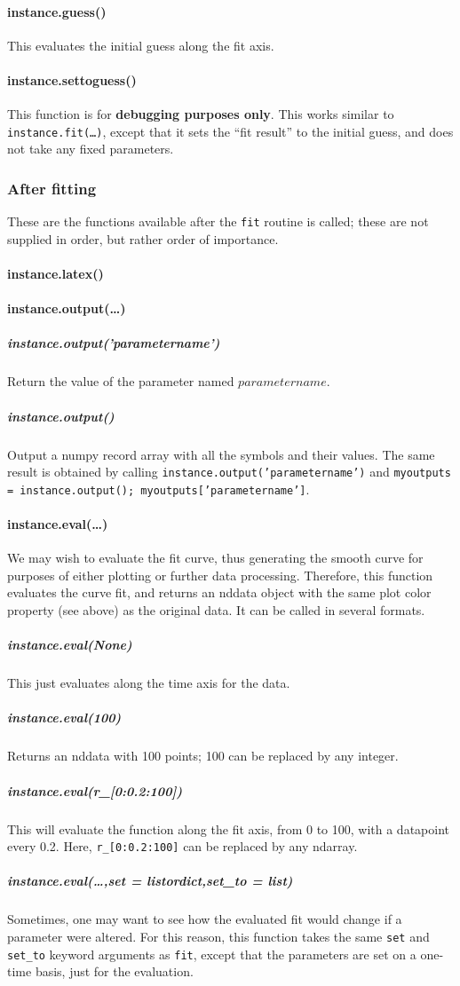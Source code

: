 \paragraph{instance.guess()}
This evaluates the initial guess along the fit axis.
\paragraph{instance.settoguess()}
This function is for {\bf debugging purposes only}.
This works similar to {\tt instance.fit(\ldots)},
    except that it sets the ``fit result'' to the initial guess,
    and does not take any fixed parameters.
\subsubsection{After fitting}
These are the functions available after the {\tt fit}
    routine is called; these are not supplied in order,
    but rather order of importance.
\paragraph{instance.latex()}
\paragraph{instance.output(\ldots)}
\subparagraph{instance.output('parametername')}
Return the value of the parameter named
    $parametername$.
\subparagraph{instance.output()}
Output a numpy record array with all the symbols and their values.
The same result is obtained by calling
    \texttt{instance.output('parametername')}
    and
    \texttt{myoutputs = instance.output();
    myoutputs['parametername']}.
\paragraph{instance.eval(\ldots)}
We may wish to evaluate the fit curve,
    thus generating the smooth curve
    for purposes of either plotting or further
    data processing.
Therefore, this function evaluates the curve fit, and returns
    an nddata object with the same plot color property (see above)
    as the original data.
It can be called in several formats.
\subparagraph{instance.eval(None)}
This just evaluates along the time axis for the data.
\subparagraph{instance.eval(100)}
Returns an nddata with 100 points;
    100 can be replaced by any integer.
\subparagraph{instance.eval(r\_[0:0.2:100])}
This will evaluate the function along the
    fit axis, from 0 to 100, with a datapoint every 0.2.
Here, {\tt r\_[0:0.2:100]} can be replaced 
    by any ndarray.
\subparagraph{instance.eval(\ldots,set = listordict,set\_to = list)}
Sometimes, one may want to see how the evaluated
    fit would change if a parameter were altered.
For this reason, this function takes the same {\tt set} and {\tt set\_to}
    keyword arguments as {\tt fit}, except that the
    parameters are set on a one-time basis, just for the evaluation.
